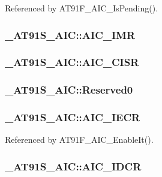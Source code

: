Referenced by AT91F\_\-AIC\_\-IsPending().\hypertarget{struct__AT91S__AIC_2eecd9e74afeac555e7b90c3594bc910}{
\subsubsection{ {\bf \_\-AT91S\_\-AIC::AIC\_\-IMR}}}
\label{struct__AT91S__AIC_2eecd9e74afeac555e7b90c3594bc910}


\hypertarget{struct__AT91S__AIC_c1e7c71a265c9818fe96b59796aaed7e}{
\subsubsection{ {\bf \_\-AT91S\_\-AIC::AIC\_\-CISR}}}
\label{struct__AT91S__AIC_c1e7c71a265c9818fe96b59796aaed7e}


\hypertarget{struct__AT91S__AIC_aaee23426dcf3698e52ba1953ac4a752}{
\subsubsection{ {\bf \_\-AT91S\_\-AIC::Reserved0}}}
\label{struct__AT91S__AIC_aaee23426dcf3698e52ba1953ac4a752}


\hypertarget{struct__AT91S__AIC_c37f1ca270fc1c2ba4857b5f9c763176}{
\subsubsection{ {\bf \_\-AT91S\_\-AIC::AIC\_\-IECR}}}
\label{struct__AT91S__AIC_c37f1ca270fc1c2ba4857b5f9c763176}




Referenced by AT91F\_\-AIC\_\-EnableIt().\hypertarget{struct__AT91S__AIC_179b0425e4194dd6a0a2a44dfabc7d67}{
\subsubsection{ {\bf \_\-AT91S\_\-AIC::AIC\_\-IDCR}}}
\label{struct__AT91S__AIC_179b0425e4194dd6a0a2a44dfabc7d67}




